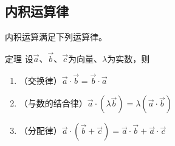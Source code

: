 \subsection{内积运算律}

内积运算满足下列运算律。

\begin{blk}{定理}
    设$\vec{a}$、$\vec{b}$、$\vec{c}$为向量、$\lambda$为实数，则
\begin{enumerate}
    \item （交换律）$\vec{a}\cdot \vec{b}=\vec{b}\cdot \vec{a}$
    \item （与数的结合律）$\vec{a}\cdot \left(\lambda\vec{b}\right)=\lambda\left(\vec{a}\cdot \vec{b}\right)$
    \item （分配律）$\vec{a}\cdot \left(\vec{b}+\vec{c}\right)=\vec{a}\cdot \vec{b}+\vec{a}\cdot \vec{c}$
\end{enumerate}
\end{blk}

